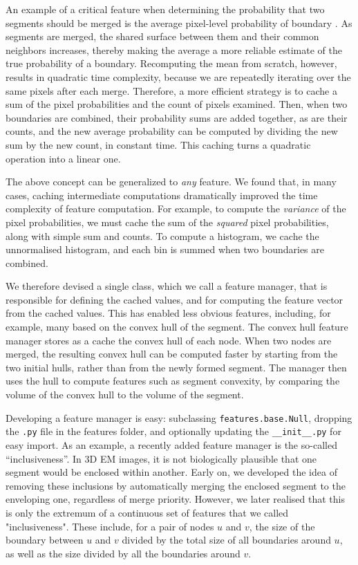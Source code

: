 \documentclass{frontiersSCNS} %
\begin{document}
An example of a critical feature when determining the probability that two segments should be merged is the average pixel-level probability of boundary \citep{Ren:2003jg}.
As segments are merged, the shared surface between them and their common neighbors increases, thereby making the average a more reliable estimate of the true probability of a boundary.
Recomputing the mean from scratch, however, results in quadratic time complexity, because we are repeatedly iterating over the same pixels after each merge.
Therefore, a more efficient strategy is to cache a sum of the pixel probabilities and the count of pixels examined.
Then, when two boundaries are combined, their probability sums are added together, as are their counts, and the new average probability can be computed by dividing the new sum by the new count, in constant time.
This caching turns a quadratic operation into a linear one.

The above concept can be generalized to \emph{any} feature.
We found that, in many cases, caching intermediate computations dramatically improved the time complexity of feature computation.
For example, to compute the \emph{variance} of the pixel probabilities, we must cache the sum of the \emph{squared} pixel probabilities, along with simple sum and counts.
To compute a histogram, we cache the unnormalised histogram, and each bin is summed when two boundaries are combined.

We therefore devised a single class, which we call a feature manager, that is responsible for defining the cached values, and for computing the feature vector from the cached values.
This has enabled less obvious features, including, for example, many based on the convex hull of the segment.
The convex hull feature manager stores as a cache the convex hull of each node.
When two nodes are merged, the resulting convex hull can be computed faster by starting from the two initial hulls, rather than from the newly formed segment.
The manager then uses the hull to compute features such as segment convexity, by comparing the volume of the convex hull to the volume of the segment.

Developing a feature manager is easy: subclassing \texttt{\small features.base.Null}, dropping the \texttt{.py} file in the features folder, and optionally updating the \texttt{\small \_\_init\_\_.py} for easy import.
As an example, a recently added feature manager is the so-called ``inclusiveness''.
In 3D EM images, it is not biologically plausible that one segment would be enclosed within another.
Early on, we developed the idea of removing these inclusions by automatically merging the enclosed segment to the enveloping one, regardless of merge priority.
However, we later realised that this is only the extremum of a continuous set of features that we called "inclusiveness".
These include, for a pair of nodes $u$ and $v$, the size of the boundary between $u$ and $v$ divided by the total size of all boundaries around $u$, as well as the size divided by all the boundaries around $v$.
\end{document}
